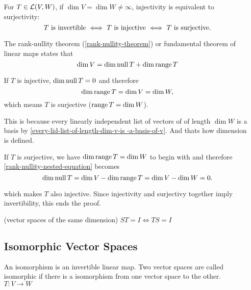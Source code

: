   \setcounter{thm}{64}
  \begin{thm} 
    \label{injectivity-is-equivalent-to-surjectivity}
    For $T\in \mathcal{L}(V,W)$, if $\dim V = \dim W \neq \infty$, injectivity is equivalent to surjectivity:
    \begin{equation}
        T$ is invertible $\iff$ $T$ is injective $\iff$ $T$ is surjective.$
    \end{equation}
  \end{thm}
  \begin{prf}
    The rank-nullity theorem (\ref{rank-nullity-theorem}) or fundamental theorem of linear maps states that
    \begin{equation}
      \label{rank-nullity-nested-equation}
      \dim V = \dim \operatorname{null} T + \dim \operatorname{range} T
    \end{equation}

    If $T$ is injective, $\dim \operatorname{null} T = 0$ and therefore 
    \begin{equation}
      \dim \operatorname{range} T = \dim V = \dim W,
    \end{equation} 
    which means $T$ is surjective ($\operatorname{range} T = \dim W$). 
    
    This is because every linearly independent list of vectors of of length $\dim W$ is a basis by \ref{every-lid-list-of-length-dim-v-is -a-basis-of-v}. And thats how dimension is defined.

    If $T$ is surjective, we have $\dim \operatorname{range} T = \dim W$ to begin with and therefore \ref{rank-nullity-nested-equation} becomes
    \begin{equation}
      \dim \operatorname{null} T = \dim V - \dim \operatorname{range} T = \dim V - \dim W = 0.
    \end{equation} 
    
    which makes $T$ also injective. 
    Since injectivity and surjectivy together imply invertibility, this ends the proof. 
  \end{prf}


  \setcounter{thm}{67}
  \begin{thm} (vector spaces of the same dimension)
    $ST = I \Leftrightarrow TS=I$
  \end{thm}

  \subsection{Isomorphic Vector Spaces}

  \begin{thm}
    An isomorphism is an invertible linear map. Two vector spaces are called isomorphic if there is a isomorphism from one vector space to the other. $T:V\to W$
  \end{thm}


